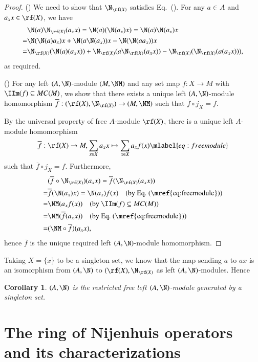 \documentclass[12pt]{amsart}
\newtheorem{coro}[theorem]{Corollary}
\theoremstyle{definition}
\renewcommand\bar[1]{\overline{#1}}
\begin{document}
\begin{proof}
() We need to show that $\N_{\rf(X)}$ satisfies Eq.~(). For any $a\in A$ and $a_x x \in \rf(X)$, we have
\begin{align*}
& \N(a)\N_{\rf(X)}( a_{x}x) = \N(a)( \N(a_{x})x)=\N(a)\N(a_{x})x \\
=&  \N(\N (a)a_{x})x +\N(a \N(a_{x}))x -\N (\N(aa_{x}))x \\
%
=& \N_{\rf(X)}(\N(a) (a_x x)) + \N_{\rf(X)}(a \N_{\rf(X)}(a_x x))-\N_{\rf(X)}(\N_{\rf(X)}(a(a_x x))),
\end{align*}
as required.

() 
For any left $(A,\N)$-module $(M,\NM)$ and any set map $f: X \to M$ with $\IIm(f) \subseteq MC(M)$, we show that there exists a unique left $(A,\N)$-module homomorphism $\overline{f}: (\rf(X), \N_{\rf(X)}) \to (M, \NM)$ such that $\overline{f} \circ j_X=f$.

By the universal property of free $A$-module $\rf(X)$, there is a unique left $A$-module homomorphism
\begin{align}
\overline{f}: \rf(X) \to M, \sum_{x\in X}a_{x}x \mapsto \sum_{x\in X}a_{x}f(x) \mlabel{eq:freemodule}
\end{align}
such that $\overline{f} \circ j_X=f$. Furthermore,
\begin{align*}
& (\overline{f} \circ \N_{\rf(X)}) (a_{x}x)  = \bar{f} (\N_{\rf(X)}( a_{x}x))\\
%
=& \overline{f} ( \N(a_{x})x)= \N(a_{x})f(x) \quad \text{(by Eq.~(\mref{eq:freemodule}))}\\
%
=& \NM(a_{x}f(x)) \quad \text{(by $\IIm(f) \subseteq MC(M)$)}\\
%
=& \NM(\overline{f}( a_{x}x)) \quad \text{(by Eq.~(\mref{eq:freemodule}))}\\
%
=& (\NM \circ \overline{f})( a_{x}x),
\end{align*}
hence $\overline{f}$ is the unique required left $(A,\N)$-module homomorphism.
\end{proof}

Taking $X=\{ x\}$ to be a singleton set, we know that the map sending $a$ to $ax$ is an isomorphism from $(A,\N)$ to $(\rf(X), \N_{\rf(X)}$ as left $(A,\N)$-modules. Hence

\begin{coro}
$(A,\N)$ is the restricted free left $(A,\N)$-module generated by a singleton set.
\end{coro}


\section{The ring of Nijenhuis operators and its characterizations}
\smallskip
{}
\end{document}
